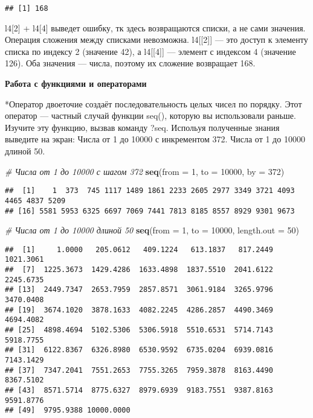 \documentclass[
]{article}
\newenvironment{Shaded}{\begin{snugshade}}{\end{snugshade}}
\newcommand{\AttributeTok}[1]{\textcolor[rgb]{0.13,0.29,0.53}{#1}}
\newcommand{\CommentTok}[1]{\textcolor[rgb]{0.56,0.35,0.01}{\textit{#1}}}
\newcommand{\DecValTok}[1]{\textcolor[rgb]{0.00,0.00,0.81}{#1}}
\newcommand{\FunctionTok}[1]{\textcolor[rgb]{0.13,0.29,0.53}{\textbf{#1}}}
\newcommand{\NormalTok}[1]{#1}
\begin{document}
\begin{verbatim}
## [1] 168
\end{verbatim}

l4{[}2{]} + l4{[}4{]} выведет ошибку, тк здесь возвращаются списки, а не
сами значения. Операция сложения между списками невозможна.
l4{[}{[}2{]}{]} --- это доступ к элементу списка по индексу 2 (значение
42), а l4{[}{[}4{]}{]} --- элемент с индексом 4 (значение 126). Оба
значения --- числа, поэтому их сложение возвращает 168.

\textbf{Работа с функциями и операторами}

*Оператор двоеточие создаёт последовательность целых чисел по порядку.
Этот оператор --- частный случай функции seq(), которую вы использовали
раньше. Изучите эту функцию, вызвав команду ?seq. Испольуя полученные
знания выведите на экран: Числа от 1 до 10000 с инкрементом 372. Числа
от 1 до 10000 длиной 50.

\begin{Shaded}
\begin{Highlighting}[]
\CommentTok{\# Числа от 1 до 10000 с шагом 372}
\FunctionTok{seq}\NormalTok{(}\AttributeTok{from =} \DecValTok{1}\NormalTok{, }\AttributeTok{to =} \DecValTok{10000}\NormalTok{, }\AttributeTok{by =} \DecValTok{372}\NormalTok{)}
\end{Highlighting}
\end{Shaded}

\begin{verbatim}
##  [1]    1  373  745 1117 1489 1861 2233 2605 2977 3349 3721 4093 4465 4837 5209
## [16] 5581 5953 6325 6697 7069 7441 7813 8185 8557 8929 9301 9673
\end{verbatim}

\begin{Shaded}
\begin{Highlighting}[]
\CommentTok{\# Числа от 1 до 10000 длиной 50}
\FunctionTok{seq}\NormalTok{(}\AttributeTok{from =} \DecValTok{1}\NormalTok{, }\AttributeTok{to =} \DecValTok{10000}\NormalTok{, }\AttributeTok{length.out =} \DecValTok{50}\NormalTok{)}
\end{Highlighting}
\end{Shaded}

\begin{verbatim}
##  [1]     1.0000   205.0612   409.1224   613.1837   817.2449  1021.3061
##  [7]  1225.3673  1429.4286  1633.4898  1837.5510  2041.6122  2245.6735
## [13]  2449.7347  2653.7959  2857.8571  3061.9184  3265.9796  3470.0408
## [19]  3674.1020  3878.1633  4082.2245  4286.2857  4490.3469  4694.4082
## [25]  4898.4694  5102.5306  5306.5918  5510.6531  5714.7143  5918.7755
## [31]  6122.8367  6326.8980  6530.9592  6735.0204  6939.0816  7143.1429
## [37]  7347.2041  7551.2653  7755.3265  7959.3878  8163.4490  8367.5102
## [43]  8571.5714  8775.6327  8979.6939  9183.7551  9387.8163  9591.8776
## [49]  9795.9388 10000.0000
\end{verbatim}
\end{document}
